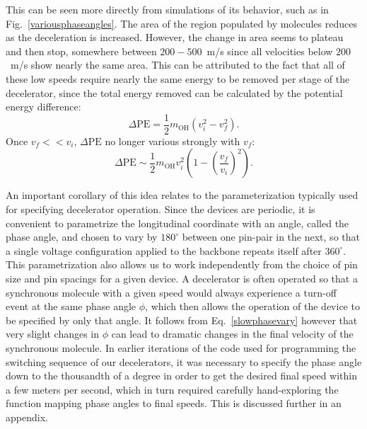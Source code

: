 This can be seen more directly from simulations of its behavior, such as in Fig.~\ref{variousphaseangles}. The area of the region populated by molecules reduces as the deceleration is increased.
However, the change in area seems to plateau and then stop, somewhere between $200-500$~m/s since all velocities below $200$~m/s show nearly the same area.
This can be attributed to the fact that all of these low speeds require nearly the same energy to be removed per stage of the decelerator, since the total energy removed can be calculated by the potential energy difference:
\begin{equation}
\Delta\text{PE}=\frac{1}{2}m_\text{OH}\left(v_i^2-v_f^2\right).
\end{equation}
Once $v_f << v_i$, $\Delta\text{PE}$ no longer various strongly with $v_f$:
\begin{equation}
\label{slowphasevary}
\Delta\text{PE}\sim\frac{1}{2}m_\text{OH}v_i^2\left(1-\left(\frac{v_f}{v_i}\right)^2\right).
\end{equation}

An important corollary of this idea relates to the parameterization typically used for specifying decelerator operation.
Since the devices are periodic, it is convenient to parametrize the longitudinal coordinate with an angle, called the phase angle, and chosen to vary by $180^\circ$ between one pin-pair in the next, so that a single voltage configuration applied to the backbone repeats itself after $360^\circ$.
This parametrization also allows us to work independently from the choice of pin size and pin spacings for a given device.
A decelerator is often operated so that a synchronous molecule with a given speed would always experience a turn-off event at the same phase angle $\phi$, which then allows the operation of the device to be specified by only that angle.
It follows from Eq.~\ref{slowphasevary} however that very slight changes in $\phi$ can lead to dramatic changes in the final velocity of the synchronous molecule.
In earlier iterations of the code used for programming the switching sequence of our decelerators, it was necessary to specify the phase angle down to the thousandth of a degree in order to get the desired final speed within a few meters per second, which in turn required carefully hand-exploring the function mapping phase angles to final speeds.
This is discussed further in an appendix.

